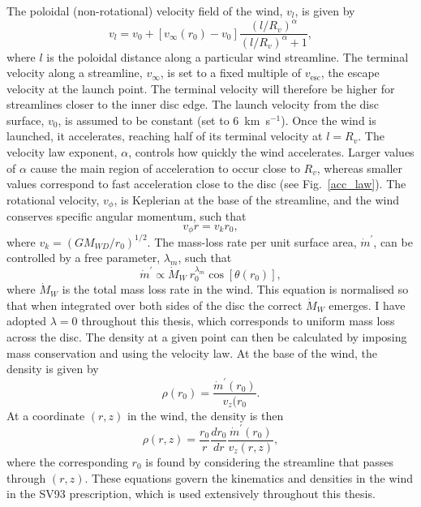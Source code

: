 The poloidal (non-rotational) velocity field of the wind, $v_l$, is given by
\begin{equation}
v_l=v_0+\left[v_{\infty}(r_0)-v_0\right]\frac{\left(l/R_v\right)^{\alpha}}{\left(l/R_v\right)^{\alpha}+1},
\label{eq:v_law}
\end{equation}
where $l$ is the poloidal distance along a particular wind
streamline. The terminal velocity along a streamline, $v_{\infty}$, is
set to a fixed multiple of $v_{\mathrm{esc}}$, the escape velocity at the launch
point. The terminal velocity will therefore be higher for streamlines closer
to the inner disc edge.
The launch velocity from the disc surface, $v_0$, is assumed to
be constant (set to $6$~km~s$^{-1}$). Once the wind is launched, it
accelerates, reaching half of its terminal velocity at $l = R_v$. The
velocity law exponent, $\alpha$, controls how quickly the wind
accelerates. Larger values of $\alpha$ cause the main region of 
acceleration to occur close to $R_v$, whereas smaller values
correspond to fast acceleration close to the disc (see
Fig.~\ref{acc_law}). The rotational velocity, $v_\phi$, is 
Keplerian at the base of the streamline, 
and the wind conserves specific angular momentum, such that
\begin{equation}
v_\phi r = v_{k} r_0,
\label{eq:vrot}
\end{equation}
where $v_{k}=(GM_{WD}/r_0)^{1/2}$.
The mass-loss rate per unit surface area, $\dot{m}^\prime$,
can be controlled by a free parameter, $\lambda_m$, such that
\begin{equation}
\dot{m}^\prime \propto \dot{M}_W~r_0^{\lambda_m} \cos [\theta(r_0)],
\label{eq:dmda}
\end{equation}
where $\dot{M}_W$ is the total mass loss rate in the wind. This equation is normalised so 
that when integrated over both sides of the disc the correct $\dot{M}_W$ emerges.
I have adopted $\lambda=0$ throughout this thesis, which corresponds to uniform
mass loss across the disc.
The density at a given point can then be calculated by imposing mass conservation
and using the velocity law. At the base of the wind, the density is 
given by
\begin{equation}
\rho (r_0) = \frac{\dot{m}^\prime(r_0)}{v_z(r_0}.
\label{eq:rho0}
\end{equation}
At a coordinate $(r,z)$ in the wind, the density is then
\begin{equation}
\rho (r, z) = \frac{r_0}{r} \frac{d r_0}{dr}\frac{\dot{m}^\prime(r_0)}{v_z(r,z)},
\label{eq:rho_rz}
\end{equation}
where the corresponding $r_0$ is found by considering the streamline that 
passes through $(r,z)$. These equations govern the kinematics
and densities in the wind in the SV93 prescription, which is used
extensively throughout this thesis. 


